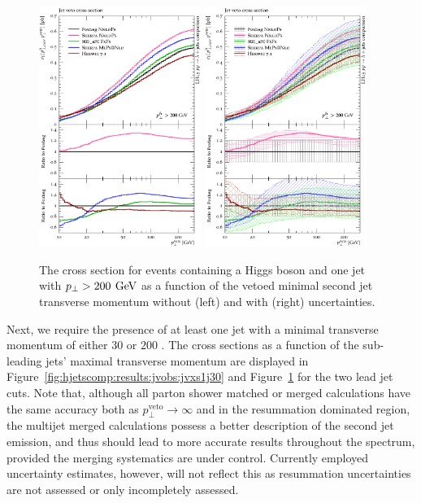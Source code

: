 \begin{figure}[t!]
  \centering
  \includegraphics[width=0.47\textwidth]{figures/hjetscomp_u_xs_jet_veto_j1_200.pdf}
  \hfill
  \includegraphics[width=0.47\textwidth]{figures/hjetscomp_xs_jet_veto_j1_200.pdf}
  \caption{
    The cross section for events containing a Higgs boson 
    and one jet with $p_\perp>200\,\text{\:GeV}$ as a function of
    the vetoed minimal second jet transverse momentum without
    (left) and with (right) uncertainties.
    \label{fig:hjetscomp:results:jvobs:jvxs1j200}
  }
\end{figure}

Next, we require the presence of at least one jet with 
a minimal transverse momentum of either $30$ or $200$ \gev. 
The cross sections as a function of 
the sub-leading jets’ maximal transverse momentum are displayed in 
Figure~\ref{fig:hjetscomp:results:jvobs:jvxs1j30} and 
Figure~\ref{fig:hjetscomp:results:jvobs:jvxs1j200} for the two lead jet cuts. 
Note that, although all parton 
shower matched or merged calculations have the same accuracy both as 
$p_\perp^\text{veto}\to\infty$ and in the resummation dominated region, 
the multijet merged calculations possess a better description of the 
second jet emission, and thus should lead to more accurate results 
throughout the spectrum, provided the merging systematics are under control. 
Currently employed uncertainty estimates, however, will not reflect this 
as resummation uncertainties are not assessed or only incompletely assessed.

